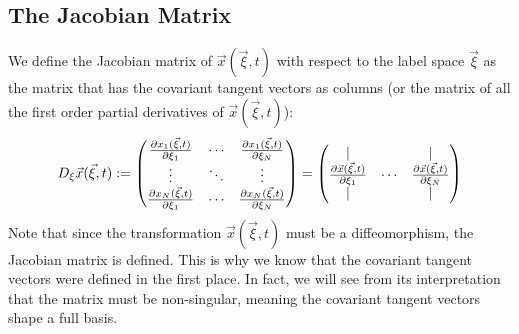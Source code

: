 \documentclass[11pt, a4paper]{article} %
\begin{document}
\subsection*{The Jacobian Matrix}
We define the Jacobian matrix of $\vec{x}(\vec{\xi},t)$ with respect to the label space $\vec{\xi}$ as the matrix that has the covariant tangent vectors as columns (or the matrix of all the first order partial derivatives of $\vec{x}(\vec{\xi},t)$):
\begin{equation}
D_\xi\vec{x}(\vec{\xi},t):=\begin{pmatrix}
\pdv{x_1(\vec{\xi},t)}{\xi_1} & \cdots & \pdv{x_1(\vec{\xi},t)}{\xi_N}\\
\vdots&\ddots&\vdots \\
\pdv{x_N(\vec{\xi},t)}{\xi_1} & \cdots & \pdv{x_N(\vec{\xi},t)}{\xi_N}
\end{pmatrix}=\begin{pmatrix}
|& &|\\
\pdv{\vec{x}(\vec{\xi},t)}{\xi_1} & \cdots & \pdv{\vec{x}(\vec{\xi},t)}{\xi_N}\\
|& &|
\end{pmatrix}
\end{equation}
Note that since the transformation $\vec{x}(\vec{\xi},t)$ must be a diffeomorphism, the Jacobian matrix is defined. This is why we know that the covariant tangent vectors were defined in the first place. In fact, we will see from its interpretation that the matrix must be non-singular, meaning the covariant tangent vectors shape a full basis.
\end{document}
